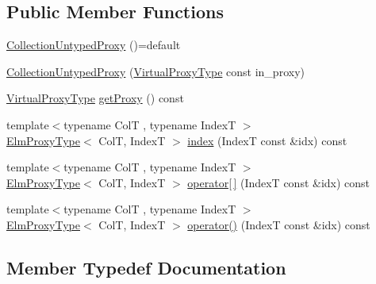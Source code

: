 \subsection*{Public Member Functions}
\begin{DoxyCompactItemize}
\item 
\hyperlink{structvt_1_1vrt_1_1collection_1_1_collection_untyped_proxy_a68c96056ba9d23597086a454e11e4125}{Collection\+Untyped\+Proxy} ()=default
\item 
\hyperlink{structvt_1_1vrt_1_1collection_1_1_collection_untyped_proxy_a8f50964f232f0bf175682933f5c29652}{Collection\+Untyped\+Proxy} (\hyperlink{namespacevt_a1b417dd5d684f045bb58a0ede70045ac}{Virtual\+Proxy\+Type} const in\+\_\+proxy)
\item 
\hyperlink{namespacevt_a1b417dd5d684f045bb58a0ede70045ac}{Virtual\+Proxy\+Type} \hyperlink{structvt_1_1vrt_1_1collection_1_1_collection_untyped_proxy_a4ccee923016e883cd6b131d2ffc156b6}{get\+Proxy} () const
\item 
{\footnotesize template$<$typename ColT , typename IndexT $>$ }\\\hyperlink{structvt_1_1vrt_1_1collection_1_1_collection_untyped_proxy_abf73984f3a31218515f9f4806f41cef5}{Elm\+Proxy\+Type}$<$ ColT, IndexT $>$ \hyperlink{structvt_1_1vrt_1_1collection_1_1_collection_untyped_proxy_a374fa73d81e8cf2fff9f2b9a494db3c8}{index} (IndexT const \&idx) const
\item 
{\footnotesize template$<$typename ColT , typename IndexT $>$ }\\\hyperlink{structvt_1_1vrt_1_1collection_1_1_collection_untyped_proxy_abf73984f3a31218515f9f4806f41cef5}{Elm\+Proxy\+Type}$<$ ColT, IndexT $>$ \hyperlink{structvt_1_1vrt_1_1collection_1_1_collection_untyped_proxy_a04bd48b1cc06e903b520d91d09b01bb3}{operator\mbox{[}$\,$\mbox{]}} (IndexT const \&idx) const
\item 
{\footnotesize template$<$typename ColT , typename IndexT $>$ }\\\hyperlink{structvt_1_1vrt_1_1collection_1_1_collection_untyped_proxy_abf73984f3a31218515f9f4806f41cef5}{Elm\+Proxy\+Type}$<$ ColT, IndexT $>$ \hyperlink{structvt_1_1vrt_1_1collection_1_1_collection_untyped_proxy_a4db7a90e93f3e3a65544c6d947e0985d}{operator()} (IndexT const \&idx) const
\end{DoxyCompactItemize}


\subsection{Member Typedef Documentation}
\mbox{\label{structvt_1_1vrt_1_1collection_1_1_collection_untyped_proxy_abf73984f3a31218515f9f4806f41cef5}} 
